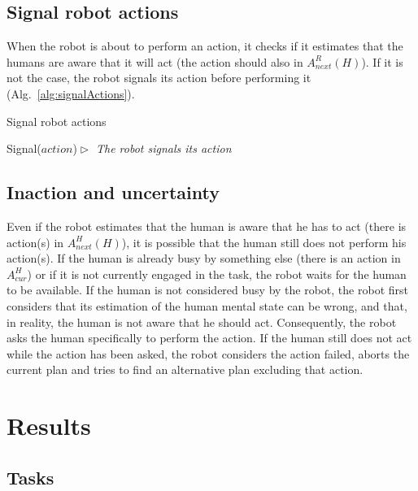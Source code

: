 \documentclass[english,a4paper,11pt,twoside]{StyleThese}
\begin{document}
\subsection{Signal robot actions}

When the robot is about to perform an action, it checks if it estimates that the humans are aware that it will act (the action should also in $A^R_{next}(H)$). If it is not the case, the robot signals its action before performing it (Alg.~\ref{alg:signalActions}).

\begin{algorithm}
\caption{Signal robot actions}
\label{alg:signalActions}
\begin{algorithmic}
\STATE Signal($action$)\hfill \textit{$\vartriangleright$ The robot signals its action}
\ENDIF
\end{algorithmic}
\end{algorithm} 


\subsection{Inaction and uncertainty}

Even if the robot estimates that the human is aware that he has to act (there is action(s) in $A^H_{next}(H)$), it is possible that the human still does not perform his action(s). If the human is already busy by something else (there is an action in $A^H_{cur}$) or if it is not currently engaged in the task, the robot waits for the human to be available. If the human is not considered busy by the robot, the robot first considers that its estimation of the human mental state can be wrong, and that, in reality, the human is not aware that he should act. Consequently, the robot asks the human specifically to perform the action. If the human still does not act while the action has been asked, the robot considers the action failed, aborts the current plan and tries to find an alternative plan excluding that action.


\section{Results}

\label{sec:resultsTOM}

\subsection{Tasks}
\end{document}

